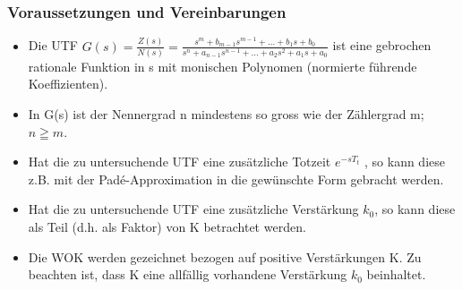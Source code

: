 \subsubsection{Voraussetzungen und Vereinbarungen }
\begin{itemize}
\item  Die UTF $G(s)=\frac{Z(s)}{N(s)}=\frac{s^m + b_{m-1}s^{m-1}+ ... + b_{1}s+b_{0}}{s^{n}+a_{n-1}s^{n-1} + ... + a_{2}s^{2}+a_{1}s + a_{0}}$
ist eine gebrochen rationale
Funktion in s mit monischen Polynomen (normierte führende Koeffizienten).
\item  In G(s) ist der Nennergrad n mindestens so gross wie der Zählergrad m; $n \geqq m$.
\item  Hat die zu untersuchende UTF eine zusätzliche Totzeit $e^{-sT_t}$ , so kann diese
z.B. mit der Padé-Approximation in die gewünschte Form gebracht werden.
\item  Hat die zu untersuchende UTF eine zusätzliche Verstärkung $k_0$, so kann diese
als Teil (d.h. als Faktor) von K betrachtet werden.
\item  Die WOK werden gezeichnet bezogen auf positive Verstärkungen K. Zu beachten
ist, dass K eine allfällig vorhandene Verstärkung $k_0$ beinhaltet.
\end{itemize}

